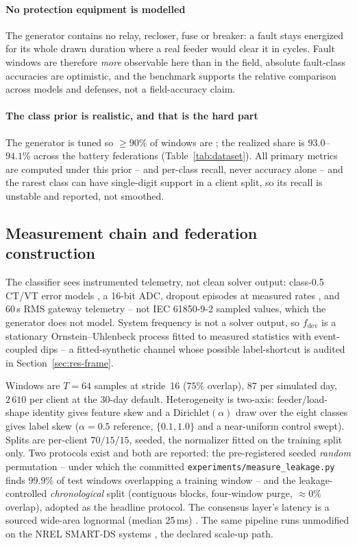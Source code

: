 \paragraph{No protection equipment is modelled}
The generator contains no relay, recloser, fuse or breaker: a fault stays
energized for its whole drawn duration where a real feeder would clear it
in cycles. Fault windows are therefore \emph{more} observable here than
in the field, absolute fault-class accuracies are optimistic, and the
benchmark supports the relative comparison across models and defenses,
not a field-accuracy claim.

\paragraph{The class prior is realistic, and that is the hard part}
The generator is tuned so $\ge 90\%$ of windows are ; the
realized share is $93.0$--$94.1\%$ across the battery federations
(Table~\ref{tab:dataset}). All primary metrics are computed under this
prior -- \macroF{} and per-class recall, never accuracy alone -- and the
rarest class can have single-digit support in a client split, so its
recall is unstable and reported, not smoothed.

\subsection{Measurement chain and federation construction}

The classifier sees instrumented telemetry, not clean solver output:
class-0.5 CT/VT error models \cite{iec61869-2,iec61869-3}, a 16-bit ADC,
dropout episodes at measured rates \cite{naspi2017}, and $60$\,s RMS
gateway telemetry -- not IEC 61850-9-2 sampled values, which the
generator does not model. System frequency is not a solver output, so
$f_{\mathrm{dev}}$ is a stationary Ornstein--Uhlenbeck process fitted to
measured statistics \cite{rydingorjao2020} with event-coupled dips -- a
fitted-synthetic channel whose possible label-shortcut is audited in
Section~\ref{sec:res-frame}.

Windows are $T{=}64$ samples at stride~16 ($75\%$ overlap), $87$ per
simulated day, $2\,610$ per client at the 30-day default. Heterogeneity
is two-axis: feeder/load-shape identity gives feature skew and a
Dirichlet$(\alpha)$ draw over the eight classes gives label skew
\cite{hsu2019} ($\alpha=0.5$ reference, $\{0.1,1.0\}$ and a near-uniform
control swept). Splits are per-client $70/15/15$, seeded, the normalizer
fitted on the training split only. Two protocols exist and both are
reported: the pre-registered seeded \emph{random} permutation -- under
which the committed \texttt{experiments/measure\_leakage.py} finds
$99.9\%$ of test windows overlapping a training window -- and the
leakage-controlled \emph{chronological} split (contiguous blocks,
four-window purge, $\approx 0\%$ overlap), adopted as the headline
protocol. The consensus layer's latency is a sourced wide-area lognormal
(median 25\,ms) \cite{aikat2003}. The same pipeline runs
unmodified on the NREL SMART-DS systems \cite{smartds}, the declared
scale-up path.
